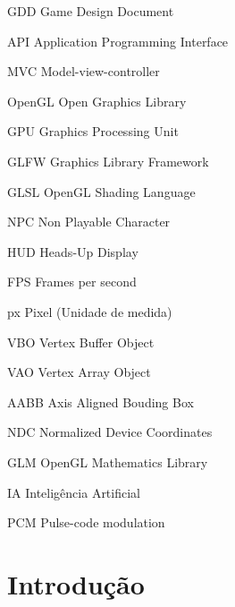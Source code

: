 \documentclass[12pt, 
openright, 
oneside, 
a4paper,    
brazil]{facom-ufu-abntex2}
\begin{document}
\begin{siglas} 
  \item[GDD] Game Design Document 
  \item[API] Application Programming Interface
  \item[MVC] Model-view-controller
  \item[OpenGL] Open Graphics Library
  \item[GPU] Graphics Processing Unit
  \item[GLFW] Graphics Library Framework
  \item[GLSL] OpenGL Shading Language
  \item[NPC] Non Playable Character
  \item[HUD] Heads-Up Display
  \item[FPS] Frames per second
  \item[px] Pixel (Unidade de medida)
  \item[VBO] Vertex Buffer Object
  \item[VAO] Vertex Array Object
  \item[AABB] Axis Aligned Bouding Box
  \item[NDC] Normalized Device Coordinates
  \item[GLM] OpenGL Mathematics Library
  \item[IA] Inteligência Artificial
  \item[PCM] Pulse-code modulation 
\end{siglas}


\tableofcontents*
\cleardoublepage






\chapter{Introdução}
\end{document}
